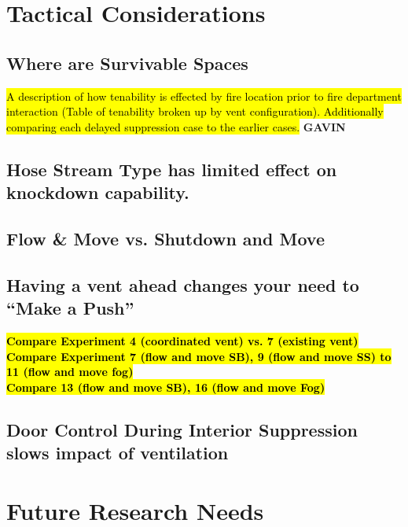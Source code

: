 \documentclass[12pt,oneside]{book}
\begin{document}

\clearpage

\chapter{Tactical Considerations}

\section{Where are Survivable Spaces}
\hl{A description of how tenability is effected by fire location prior to fire department interaction (Table of tenability broken up by vent configuration). Additionally comparing each delayed suppression case to the earlier cases.} \textbf{GAVIN}

\section{Hose Stream Type has limited effect on knockdown capability.}

\section{Flow \& Move vs. Shutdown and Move}

\section{Having a vent ahead changes your need to ``Make a Push''}

	\textbf{\hl{Compare Experiment 4 (coordinated vent) vs. 7 (existing vent)}} \\
	
	\textbf{\hl{Compare Experiment 7 (flow and move SB), 9 (flow and move SS) to 11 (flow and move fog)}} \\
	
	\textbf{\hl{Compare 13 (flow and move SB), 16 (flow and move Fog)}} \\

\section{Door Control During Interior Suppression slows impact of ventilation}


\chapter{Future Research Needs}
\end{document}
